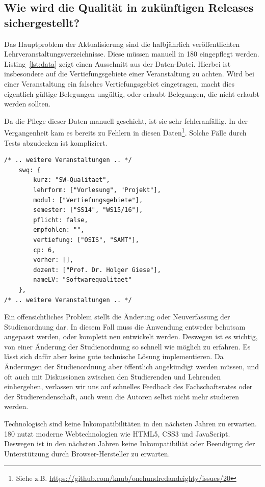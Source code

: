\documentclass[ngerman]{article}
\begin{document}
\subsection{Wie wird die Qualität in zukünftigen Releases sichergestellt?}
\label{sec:releases}

Das Hauptproblem der Aktualisierung sind die halbjährlich veröffentlichten Lehrveranstaltungsverzeichnisse.
Diese müssen manuell in 180 eingepflegt werden.
Listing~\ref{lst:data} zeigt einen Ausschnitt aus der Daten-Datei.
Hierbei ist insbesondere auf die Vertiefungsgebiete einer Veranstaltung zu achten.
Wird bei einer Veranstaltung ein falsches Vertiefungsgebiet eingetragen, macht dies eigentlich gültige Belegungen ungültig, oder erlaubt Belegungen, die nicht erlaubt werden sollten.

Da die Pflege dieser Daten manuell geschieht, ist sie sehr fehleranfällig.
In der Vergangenheit kam es bereits zu Fehlern in diesen Daten\footnote{Siehe z.B. \url{https://github.com/knub/onehundredandeighty/issues/20}}.
Solche Fälle durch Tests abzudecken ist kompliziert.

\begin{lstlisting}[caption=Ausschnitt aus \texttt{data.js},label={lst:data},frame=single]
/* .. weitere Veranstaltungen .. */
    swq: {
        kurz: "SW-Qualitaet",
        lehrform: ["Vorlesung", "Projekt"],
        modul: ["Vertiefungsgebiete"],
        semester: ["SS14", "WS15/16"],
        pflicht: false,
        empfohlen: "",
        vertiefung: ["OSIS", "SAMT"],
        cp: 6,
        vorher: [],
        dozent: ["Prof. Dr. Holger Giese"],
        nameLV: "Softwarequalitaet"
    },
/* .. weitere Veranstaltungen .. */
\end{lstlisting}


Ein offensichtliches Problem stellt die Änderung oder Neuverfassung der Studienordnung dar.
In diesem Fall muss die Anwendung entweder behutsam angepasst werden, oder komplett neu entwickelt werden.
Deswegen ist es wichtig, von einer Änderung der Studienordnung so schnell wie möglich zu erfahren.
Es lässt sich dafür aber keine gute technische Lösung implementieren.
Da Änderungen der Studienordnung aber öffentlich angekündigt werden müssen, und oft auch mit Diskussionen zwischen den Studierenden und Lehrenden einhergehen, verlassen wir uns auf schnelles Feedback des Fachschaftsrates oder der Studierendenschaft, auch wenn die Autoren selbst nicht mehr studieren werden.

Technologisch sind keine Inkompatibilitäten in den nächsten Jahren zu erwarten.
180 nutzt moderne Webtechnologien wie HTML5, CSS3 und JavaScript.
Deswegen ist in den nächsten Jahren keine Inkompatibiliät oder Beendigung der Unterstützung durch Browser-Hersteller zu erwarten.
\end{document}
